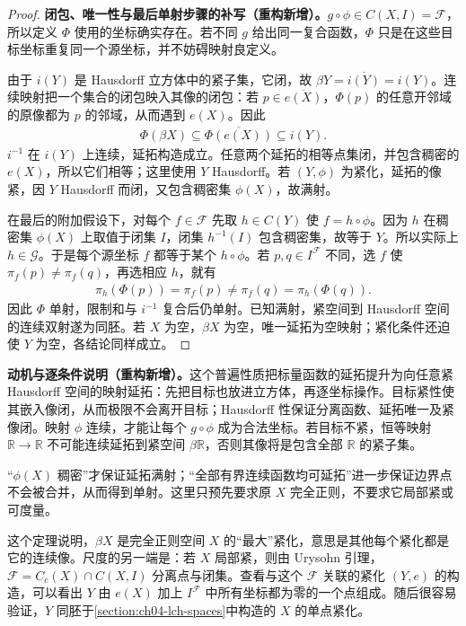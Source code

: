\documentclass[../../main.tex]{subfiles}
\begin{document}
\begin{proof}
\textbf{闭包、唯一性与最后单射步骤的补写（重构新增）。}$g\circ\phi\in C(X,I)=\mathcal F$，所以定义 $\Phi$ 使用的坐标确实存在。若不同 $g$ 给出同一复合函数，$\Phi$ 只是在这些目标坐标重复同一个源坐标，并不妨碍映射良定义。

由于 $i(Y)$ 是 Hausdorff 立方体中的紧子集，它闭，故 $\beta Y=\overline{i(Y)}=i(Y)$。连续映射把一个集合的闭包映入其像的闭包：若 $p\in\overline{e(X)}$，$\Phi(p)$ 的任意开邻域的原像都为 $p$ 的邻域，从而遇到 $e(X)$。因此
\begin{align*}
\Phi(\beta X)\subseteq\overline{\Phi(e(X))}\subseteq i(Y).
\end{align*}
$i^{-1}$ 在 $i(Y)$ 上连续，延拓构造成立。任意两个延拓的相等点集闭，并包含稠密的 $e(X)$，所以它们相等；这里使用 $Y$ Hausdorff。若 $(Y,\phi)$ 为紧化，延拓的像紧，因 $Y$ Hausdorff 而闭，又包含稠密集 $\phi(X)$，故满射。

在最后的附加假设下，对每个 $f\in\mathcal F$ 先取 $h\in C(Y)$ 使 $f=h\circ\phi$。因为 $h$ 在稠密集 $\phi(X)$ 上取值于闭集 $I$，闭集 $h^{-1}(I)$ 包含稠密集，故等于 $Y$。所以实际上 $h\in\mathcal G$。于是每个源坐标 $f$ 都等于某个 $h\circ\phi$。若 $p,q\in I^{\mathcal F}$ 不同，选 $f$ 使 $\pi_f(p)\ne\pi_f(q)$，再选相应 $h$，就有
\begin{align*}
\pi_h(\Phi(p))=\pi_f(p)\ne\pi_f(q)=\pi_h(\Phi(q)).
\end{align*}
因此 $\Phi$ 单射，限制和与 $i^{-1}$ 复合后仍单射。已知满射，紧空间到 Hausdorff 空间的连续双射遂为同胚。若 $X$ 为空，$\beta X$ 为空，唯一延拓为空映射；紧化条件还迫使 $Y$ 为空，各结论同样成立。
\end{proof}
\begin{remark}
\textbf{动机与逐条件说明（重构新增）。}这个普遍性质把标量函数的延拓提升为向任意紧 Hausdorff 空间的映射延拓：先把目标也放进立方体，再逐坐标操作。目标紧性使其嵌入像闭，从而极限不会离开目标；Hausdorff 性保证分离函数、延拓唯一及紧像闭。映射 $\phi$ 连续，才能让每个 $g\circ\phi$ 成为合法坐标。若目标不紧，恒等映射 $\mathbb R\to\mathbb R$ 不可能连续延拓到紧空间 $\beta\mathbb R$，否则其像将是包含全部 $\mathbb R$ 的紧子集。

“$\phi(X)$ 稠密”才保证延拓满射；“全部有界连续函数均可延拓”进一步保证边界点不会被合并，从而得到单射。这里只预先要求原 $X$ 完全正则，不要求它局部紧或可度量。
\end{remark}
这个定理说明，$\beta X$ 是完全正则空间 $X$ 的“最大”紧化，意思是其他每个紧化都是它的连续像。尺度的另一端是：若 $X$ 局部紧，则由 Urysohn 引理，$\mathcal F=C_c(X)\cap C(X,I)$ 分离点与闭集。查看与这个 $\mathcal F$ 关联的紧化 $(Y,e)$ 的构造，可以看出 $Y$ 由 $e(X)$ 加上 $I^{\mathcal F}$ 中所有坐标都为零的一个点组成。随后很容易验证，$Y$ 同胚于\cref{section:ch04-lch-spaces}中构造的 $X$ 的单点紧化。
\end{document}
